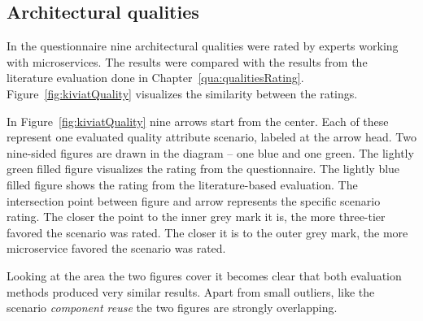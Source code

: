\subsection{Architectural qualities}

In the questionnaire nine architectural qualities were rated by experts working with microservices.
The results were compared with the results from the literature evaluation done in Chapter~\ref{qua:qualitiesRating}.
Figure~\ref{fig:kiviatQuality} visualizes the similarity between the ratings.

In Figure~\ref{fig:kiviatQuality} nine arrows start from the center.
Each of these represent one evaluated quality attribute scenario, labeled at the arrow head. 
Two nine-sided figures are drawn in the diagram -- one blue and one green.
The lightly green filled figure visualizes the rating from the questionnaire.
The lightly blue filled figure shows the rating from the literature-based evaluation.
The intersection point between figure and arrow represents the specific scenario rating.
The closer the point to the inner grey mark it is, the more three-tier favored the scenario was rated.
The closer it is to the outer grey mark, the more microservice favored the scenario was rated.

Looking at the area the two figures cover it becomes clear that both evaluation methods produced very similar results.
Apart from small outliers, like the scenario \textit{component reuse} the two figures are strongly overlapping.

